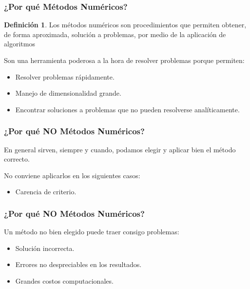 \documentclass[xcolor=svgnames]{beamer} %
\theoremstyle{plain}
\renewcommand{\textbf}[1]{{\bfseries\textcolor{redUnq2}{#1}}}
\theoremstyle{definition}
\newtheorem{defi}{Definición}
\begin{document}
\begin{frame}
\frametitle{¿Por qué Métodos Numéricos?}
\begin{tcolorbox}
	\begin{defi}
		Los métodos numéricos son procedimientos que permiten obtener, de forma aproximada, solución a problemas, por medio de la aplicación de algoritmos
	\end{defi}
\end{tcolorbox}


Son una herramienta poderosa a la hora de resolver problemas porque permiten:
\begin{itemize}
	\item Resolver problemas rápidamente.
	\item Manejo de dimensionalidad grande.
	\item Encontrar soluciones a problemas que no pueden resolverse analíticamente.
\end{itemize}

\end{frame}


\begin{frame}
\frametitle{¿Por qué \textbf{NO} Métodos Numéricos?}

En general sirven, siempre y cuando, podamos elegir y aplicar bien el método correcto.
\vspace{40pt}

{\centering
No conviene aplicarlos en los siguientes casos:
\begin{itemize}
	\item Carencia de criterio.
\end{itemize}}



\end{frame}


\begin{frame}
\frametitle{¿Por qué \textbf{NO} Métodos Numéricos?}



Un método no bien elegido puede traer consigo problemas:
\vspace{40pt}

\begin{itemize}
\item Solución incorrecta.
\item Errores no despreciables en los resultados.
\item Grandes costos computacionales.
\end{itemize}


\end{frame}
\end{document}
